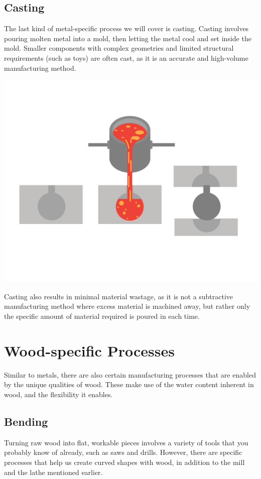 \subsection{Casting}

The last kind of metal-specific process we will cover is casting. Casting involves pouring molten metal into a mold, then letting the metal cool and set inside the mold. Smaller components with complex geometries and limited structural requirements (such as toys) are often cast, as it is an accurate and high-volume manufacturing method.

\includegraphics[width=.75\textwidth]{casting.png}


Casting also results in minimal material wastage, as it is not a subtractive manufacturing method where excess material is machined away, but rather only the specific amount of material required is poured in each time.

\section{Wood-specific Processes}

Similar to metals, there are also certain manufacturing processes that are enabled by the unique qualities of wood. These make use of the water content inherent in wood, and the flexibility it enables.

\subsection{Bending}

Turning raw wood into flat, workable pieces involves a variety of tools that you probably know of already, such as saws and drills. However, there are specific processes that help us create curved shapes with wood, in addition to the mill and the lathe mentioned earlier.

